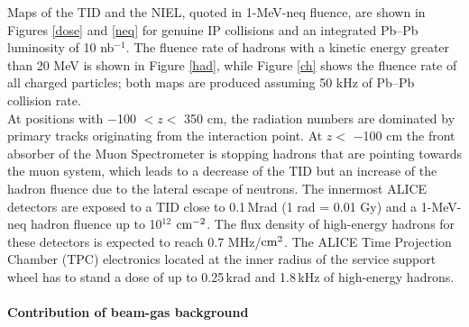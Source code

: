 \noindent Maps of the TID and the NIEL, quoted in 1-MeV-neq fluence, are shown in Figures \ref{dose} and \ref{neq} for genuine IP collisions and an integrated Pb--Pb luminosity of 10 nb$^{-1}$. The fluence rate of hadrons with a kinetic energy greater than 20 MeV is shown in Figure \ref{had}, while Figure \ref{ch} shows the fluence rate of all charged particles; both maps are produced assuming 50 kHz of Pb--Pb collision rate.\\
At positions with $-$100 $< z <$ 350 cm, the radiation numbers are dominated by primary tracks originating from the interaction point. At $z <$ $-$100 cm the front absorber of the Muon Spectrometer is stopping hadrons that are pointing towards the muon system, which leads to a decrease of the TID but an increase of the hadron fluence due to the lateral escape of neutrons. The innermost ALICE detectors are exposed to a TID close to 0.1\,Mrad (1 rad = 0.01 Gy) and a 1-MeV-neq hadron fluence up to 10$^{12}$  $\rm{cm}^{-2}$. The flux density of high-energy hadrons for these detectors is expected to reach 0.7 MHz/$\rm{cm}^{2}$. The ALICE Time Projection Chamber (TPC) electronics located at the inner radius of the service support wheel has to stand a dose of up to 0.25\,krad and 1.8\,kHz of high-energy hadrons.


\paragraph{Contribution of beam-gas background}

